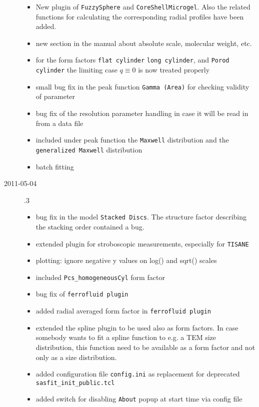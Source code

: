 \begin{description}
\begin{itemize}
      \item New plugin of \texttt{FuzzySphere} and \texttt{CoreShellMicrogel}.
            Also the related functions for calculating the corresponding radial profiles have been added.
      \item new section in the manual about absolute scale, molecular weight, etc.
      \item for the form factors \texttt{flat cylinder} \texttt{long cylinder}, and \texttt{Porod cylinder}
            the limiting case $q \equiv 0$ is now treated properly
      \item small bug fix in the peak function \texttt{Gamma (Area)} for checking
            validity of parameter
      \item bug fix of the resolution parameter handling in case it will be read in from a data file
      \item included under peak function the \texttt{Maxwell} distribution and the
            \texttt{generalized Maxwell} distribution
      \item batch fitting
    \end{itemize}
    \item[2011-05-04] .3
        \begin{itemize}
        \item  bug fix in the model \texttt{Stacked Discs}. The structure factor describing the
            stacking order contained a bug.
        \item extended plugin for stroboscopic measurements, especially for \texttt{TISANE}
        \item plotting: ignore negative y values on log() and sqrt() scales
        \item included \texttt{Pcs\_homogeneousCyl} form factor
        \item bug fix of \texttt{ferrofluid plugin}
        \item added radial averaged form factor in \texttt{ferrofluid plugin}
        \item extended the spline plugin to be used also as form factors.
            In case somebody wants to fit a spline function to e.g. a TEM size distribution,
            this function need to be available as a form factor and not only as a size
            distribution.
        \item added configuration file \texttt{config.ini} as replacement for
            deprecated \texttt{sasfit\_init\_public.tcl}
        \item added switch for disabling \texttt{About} popup at start time via config file

\end{itemize}
\end{description}
